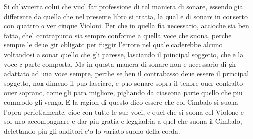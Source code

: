 Si ch'avuerta colui che vuol far professione di tal maniera di sonare, essendo gia differente da quella che nel presente libro si tratta, la qual e di sonare in conserto con quattro o ver cinque Violoni. Per che in quella fia necessario, accioche sia ben fatta, chel contrapunto sia sempre conforme a quella voce che suona, perche sempre le deue gir obligato per fuggir l'errore nel quale caderebbe alcuno voltandosi a sonar quello che gli paresse, lasciando il principal soggetto, che e la voce e parte composta. Ma in questa manera di sonare non e necessario di gir adattato ad una voce sempre, perche se ben il contrabasso deue essere il principal soggetto, non dimeno il puo lasciare, e puo sonare sopra il tenore ouer contralto ouer soprano, come gli para migliore, pigliando da ciascona parte quello che piu commodo gli venga. E la ragion di questo dico essere che col Cimbalo si suona l'opra perfetiamente, cioe con tutte le sue voci, e quel che si suona col Violone e sol uno accompagnare e dar piu gratia e leggiadria a quel che suona il Cimbalo, delettando piu gli auditori c`o lo variato suono della corda.

